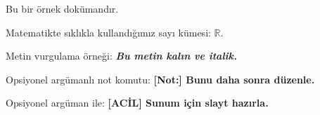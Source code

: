 \documentclass{article}
\newcommand{\R}{\mathbb{R}}
\newcommand{\boldit}[1]{\textbf{\textit{#1}}}
\newcommand{\todo}[2][Not:]{\textbf{[#1] #2}}
\begin{document}
Bu bir örnek dokümandır.

Matematikte sıklıkla kullandığımız sayı kümesi: \(\R\).

Metin vurgulama örneği: \boldit{Bu metin kalın ve italik.}

Opsiyonel argümanlı not komutu:
\todo{Bunu daha sonra düzenle.}

Opsiyonel argüman ile:
\todo[ACİL]{Sunum için slayt hazırla.}
\end{document}
